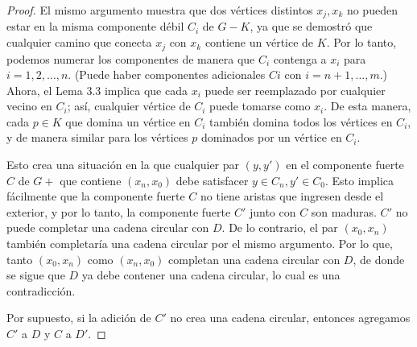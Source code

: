 \begin{proof}
El mismo argumento muestra que dos v\'ertices distintos $x_j, x_k$ no pueden
estar en la misma componente débil $C_i$ de $G - K$, ya que se demostró que
cualquier camino que conecta $x_j$ con $x_k$ contiene un vértice de $K$. Por lo
tanto, podemos numerar los componentes de manera que $C_i$ contenga a $x_i$ para
$i = 1, 2, \dots, n$. (Puede haber componentes adicionales $Ci $ con $i = n + 1,
\dots , m$.) Ahora, el Lema 3.3 implica que cada $x_i$ puede ser reemplazado por
cualquier vecino en $C_i$; así, cualquier vértice de $C_i$ puede tomarse como
$x_i$. De esta manera, cada $p \in K$ que domina un vértice en $C_i$ también
domina todos los vértices en $C_i$, y de manera similar para los vértices $p$
dominados por un vértice en $C_i$.

Esto crea una situación en la que cualquier par $(y, y')$ en el componente
fuerte $C$ de $G +$ que contiene $(x_n, x_0)$ debe satisfacer $y \in  C_n, y'
\in C_0$. Esto implica fácilmente que la componente fuerte $C$ no tiene aristas
que ingresen desde el exterior, y por lo tanto, la componente fuerte $C'$ junto
con $C$ son maduras. $C'$ no puede completar una cadena circular con $D$. De lo
contrario, el par $(x_0, x_n)$ también completaría una cadena circular por el
mismo argumento. Por lo que, tanto $(x_0, x_n)$ como $(x_n, x_0)$ completan
una cadena circular con $D$, de donde se sigue que $D$ ya debe contener una
cadena circular, lo cual es una contradicción.

Por supuesto, si la adición de $C'$ no crea una cadena circular, entonces
agregamos $C '$ a $D$ y $C$ a $D'$.
\end{proof}